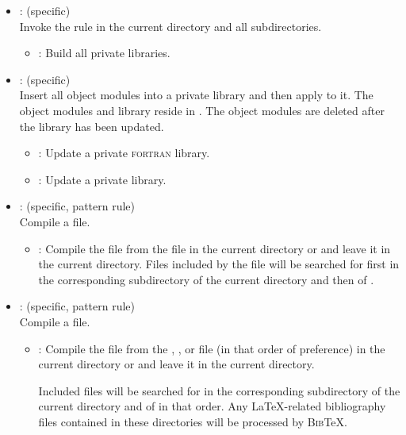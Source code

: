 \begin{itemize}
\item
    : (specific)
   \\ Invoke the  rule in the current directory and all
   subdirectories.
   \begin{itemize}
   \item
      : Build all private  libraries.
   \end{itemize}

\item
    : (specific)
   \\ Insert all object modules into a private library and then apply
    to it.  The object modules and library reside in
   .  The object modules are deleted after the library
   has been updated.
   \begin{itemize}
   \item
      : Update a private \textsc{fortran} library.
   \item
      : Update a private  library.
   \end{itemize}

\item
    : (specific, pattern rule)
   \\ Compile a  file.
   \begin{itemize}
   \item
      : Compile the  file from the  file in
      the current directory or  and leave it in the current
      directory.  Files included by the  file will be searched for
      first in the corresponding  subdirectory of the current
      directory and then of .
   \end{itemize}

\item
    : (specific, pattern rule)
   \\ Compile a  file.
   \begin{itemize}
   \item
      : Compile the  file from the ,
      , or  file (in that order of preference) in the
      current directory or  and leave it in the current
      directory.

      Included files will be searched for in the corresponding 
      subdirectory of the current directory and of  in that
      order.  Any \LaTeX-related  bibliography files
      contained in these directories will be processed by \textsc{Bib}\TeX.
   \end{itemize}


\end{itemize}
